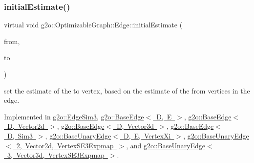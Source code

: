 \mbox{\label{classg2o_1_1_optimizable_graph_1_1_edge_a9519f8892e97f03daacb44ea50ac7f4e}} 
\subsubsection{\texorpdfstring{initial\+Estimate()}{initialEstimate()}}
{\footnotesize\ttfamily virtual void g2o\+::\+Optimizable\+Graph\+::\+Edge\+::initial\+Estimate (\begin{DoxyParamCaption}\item[{const \mbox{\hyperlink{classg2o_1_1_hyper_graph_a703938cdb4bb636860eed55a2489d70c}{Optimizable\+Graph\+::\+Vertex\+Set}} \&}]{from,  }\item[{\mbox{\hyperlink{classg2o_1_1_optimizable_graph_1_1_vertex}{Optimizable\+Graph\+::\+Vertex}} $\ast$}]{to }\end{DoxyParamCaption})\hspace{0.3cm}{\ttfamily [pure virtual]}}

set the estimate of the to vertex, based on the estimate of the from vertices in the edge. 

Implemented in \mbox{\hyperlink{classg2o_1_1_edge_sim3_afac4cc093af6f54adb278c142f33dcca}{g2o\+::\+Edge\+Sim3}}, \mbox{\hyperlink{classg2o_1_1_base_edge_a0c3d9763f1dc504627df75e0f381ca70}{g2o\+::\+Base\+Edge$<$ D, E $>$}}, \mbox{\hyperlink{classg2o_1_1_base_edge_a0c3d9763f1dc504627df75e0f381ca70}{g2o\+::\+Base\+Edge$<$ D, Vector2d $>$}}, \mbox{\hyperlink{classg2o_1_1_base_edge_a0c3d9763f1dc504627df75e0f381ca70}{g2o\+::\+Base\+Edge$<$ D, Vector3d $>$}}, \mbox{\hyperlink{classg2o_1_1_base_edge_a0c3d9763f1dc504627df75e0f381ca70}{g2o\+::\+Base\+Edge$<$ D, Sim3 $>$}}, \mbox{\hyperlink{classg2o_1_1_base_unary_edge_a3d3311901116092cf817b094f6a0b44b}{g2o\+::\+Base\+Unary\+Edge$<$ D, E, Vertex\+Xi $>$}}, \mbox{\hyperlink{classg2o_1_1_base_unary_edge_a3d3311901116092cf817b094f6a0b44b}{g2o\+::\+Base\+Unary\+Edge$<$ 2, Vector2d, Vertex\+S\+E3\+Expmap $>$}}, and \mbox{\hyperlink{classg2o_1_1_base_unary_edge_a3d3311901116092cf817b094f6a0b44b}{g2o\+::\+Base\+Unary\+Edge$<$ 3, Vector3d, Vertex\+S\+E3\+Expmap $>$}}.

\mbox{\label{classg2o_1_1_optimizable_graph_1_1_edge_a1cef6ffa0f82f1ad3dd3d7a9f04425ee}} 
